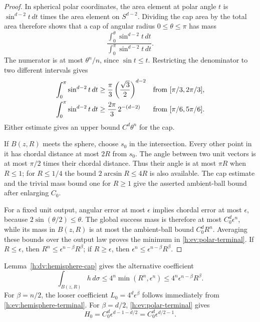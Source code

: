 \begin{proof}
In spherical polar coordinates, the area element at polar angle \(t\)
is \(\sin^{d-2}t\,dt\) times the area element on \(S^{d-2}\).
Dividing the cap area by the total area therefore shows that a cap
of angular radius \(0\le\theta\le\pi\) has mass
\[
 \frac{\int_0^\theta\sin^{d-2}t\,dt}
      {\int_0^\pi\sin^{d-2}t\,dt}.
\]
The numerator is at most \(\theta^n/n\), since \(\sin t\le t\).
Restricting the denominator to two different intervals gives
\begin{align}
 \int_0^\pi\sin^{d-2}t\,dt
 &\ge \frac\pi3\left(\frac{\sqrt3}{2}\right)^{d-2}
 &&\text{from }[\pi/3,2\pi/3],
 \notag\\
 \int_0^\pi\sin^{d-2}t\,dt
 &\ge \frac{2\pi}{3}\,2^{-(d-2)}
 &&\text{from }[\pi/6,5\pi/6].
 \label{h:ev:polar-denominators}
\end{align}
Either estimate gives an upper bound \(C^d\theta^n\) for the cap.

If \(B(z,R)\) meets the sphere, choose \(s_0\) in the intersection.
Every other point in it has chordal distance at most \(2R\) from
\(s_0\).  The angle between two unit vectors is at most \(\pi/2\)
times their chordal distance.  Thus their angle is at most \(\pi R\)
when \(R\le1\); for \(R\le1/4\) the bound
\(2\arcsin R\le4R\) is also available.  The cap estimate and the
trivial mass bound one for \(R\ge1\) give the asserted ambient-ball
bound after enlarging \(C_0\).

For a fixed unit output, angular error at most \(\epsilon\) implies
chordal error at most \(\epsilon\), because
\(2\sin(\theta/2)\le\theta\).  The global success mass is therefore
at most \(C_0^d\epsilon^n\), while its mass in \(B(z,R)\) is at most
the ambient-ball bound \(C_0^dR^n\).  Averaging these bounds over
the output law proves the minimum in \eqref{h:ev:polar-terminal}.
If \(R\le\epsilon\), then \(R^n\le\epsilon^{n-\beta}R^\beta\);
if \(R\ge\epsilon\), then
\(\epsilon^n\le\epsilon^{n-\beta}R^\beta\).
\end{proof}

Lemma~\ref{h:dv:hemisphere-cap} gives the
alternative coefficient
\begin{equation}\label{h:ev:hemisphere-terminal}
 \int_{B(z,R)}h\,d\sigma
 \le4^n\min(R^n,\epsilon^n)
 \le4^n\epsilon^{n-\beta}R^\beta.
\end{equation}
For \(\beta=n/2\), the looser coefficient
\(L_0=4^d\epsilon^\beta\) follows immediately from
\eqref{h:ev:hemisphere-terminal}.  For \(\beta=d/2\),
\eqref{h:ev:polar-terminal} gives
\begin{equation}\label{h:ev:half-ambient-terminal}
 H_0=C_0^d\epsilon^{d-1-d/2}
     =C_0^d\epsilon^{d/2-1}.
\end{equation}

